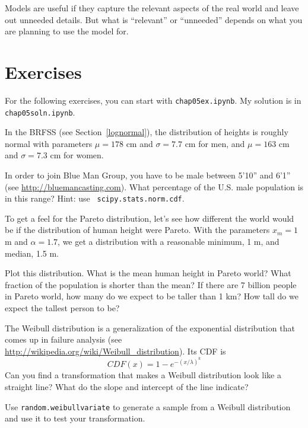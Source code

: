 \documentclass[12pt]{book}
\begin{document}
Models are useful if they capture the relevant aspects of the
real world and leave out unneeded details.  But what is ``relevant''
or ``unneeded'' depends on what you are planning to use the model
for.


\section{Exercises}

For the following exercises, you can start with \verb"chap05ex.ipynb".
My solution is in \verb"chap05soln.ipynb".

\begin{exercise}
In the BRFSS (see Section~\ref{lognormal}), the distribution of
heights is roughly normal with parameters $\mu = 178$ cm and
$\sigma = 7.7$ cm for men, and $\mu = 163$ cm and $\sigma = 7.3$ cm for
women.

In order to join Blue Man Group, you have to be male between 5'10''
and 6'1'' (see \url{http://bluemancasting.com}).  What percentage of
the U.S. male population is in this range?  Hint: use {\tt
  scipy.stats.norm.cdf}.

\end{exercise}


\begin{exercise}
To get a feel for the Pareto distribution, let's see how different
the world
would be if the distribution of human height were Pareto.
With the parameters $x_{m} = 1$ m and $\alpha = 1.7$, we
get a distribution with a reasonable minimum, 1 m,
and median, 1.5 m.

Plot this distribution.  What is the mean human height in Pareto
world?  What fraction of the population is shorter than the mean?  If
there are 7 billion people in Pareto world, how many do we expect to
be taller than 1 km?  How tall do we expect the tallest person to be?

\end{exercise}


\begin{exercise}
\label{weibull}

The Weibull distribution is a generalization of the exponential
distribution that comes up in failure analysis
(see \url{http://wikipedia.org/wiki/Weibull_distribution}).  Its CDF is
%
\[ CDF(x) = 1 - e^{-(x / \lambda)^k} \]
%
Can you find a transformation that makes a Weibull distribution look
like a straight line?  What do the slope and intercept of the
line indicate?

Use {\tt random.weibullvariate} to generate a sample from a
Weibull distribution and use it to test your transformation.

\end{exercise}
\end{document}
